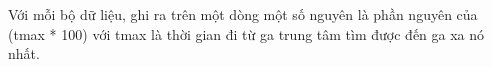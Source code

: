 Với mỗi bộ dữ liệu, ghi ra trên một dòng một số nguyên là phần nguyên của (tmax * 100) với tmax là thời gian đi từ ga trung tâm tìm được đến ga xa nó nhất.